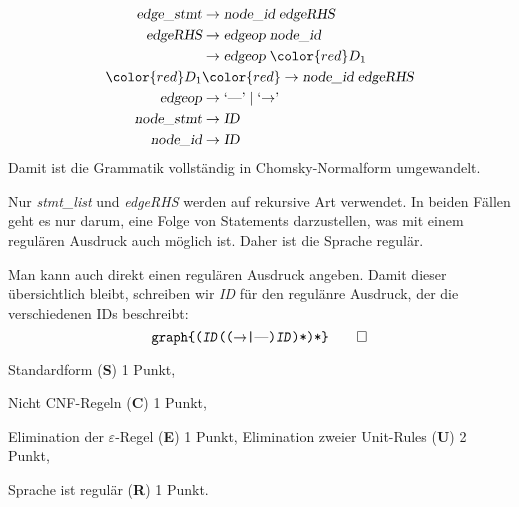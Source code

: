 \begin{loesung}
\begin{teilaufgaben}
\begin{align*}
\textsl{edge\_stmt}&\rightarrow \textsl{node\_id}\; \textsl{edgeRHS} \\
\textsl{edgeRHS}   &\rightarrow \textsl{edgeop}\; \textsl{node\_id}\\
                   &\rightarrow \textsl{edgeop}\; \color{red}D_1\\
\color{red}D_1     &\color{red}\rightarrow \textsl{node\_id}\; \textsl{edgeRHS}\\
\textsl{edgeop}    &\rightarrow \textrm{`\text{---}'}\; |\; \textrm{`$\rightarrow$'}\; \\
\textsl{node\_stmt}&\rightarrow \textsl{ID} \\
\textsl{node\_id}  &\rightarrow \textsl{ID}
\end{align*}
Damit ist die Grammatik vollständig in Chomsky-Normalform umgewandelt.
\item Nur \textsl{stmt\_list} und \textsl{edgeRHS} werden auf rekursive
Art verwendet. In beiden Fällen geht es nur darum, eine Folge von
Statements darzustellen, was mit einem regulären Ausdruck auch möglich ist.
Daher ist die Sprache regulär.

Man kann auch direkt einen regulären Ausdruck angeben. Damit dieser übersichtlich
bleibt, schreiben wir \textsl{ID} für den regulänre Ausdruck, der die verschiedenen
IDs beschreibt:
\[
\texttt{graph\{%
(\textsl{ID}(($\rightarrow$|\textrm{---})\textsl{ID})*)*%
\}}
\qedhere
\]
\end{teilaufgaben}
\end{loesung}

\begin{bewertung}
\begin{teilaufgaben}
\item Standardform (\textbf{S}) 1 Punkt,
\item Nicht CNF-Regeln (\textbf{C}) 1 Punkt,
\item Elimination der $\varepsilon$-Regel (\textbf{E}) 1 Punkt,
Elimination zweier Unit-Rules (\textbf{U}) 2 Punkt,
\item Sprache ist regulär (\textbf{R}) 1 Punkt.
\end{teilaufgaben}
\end{bewertung}
